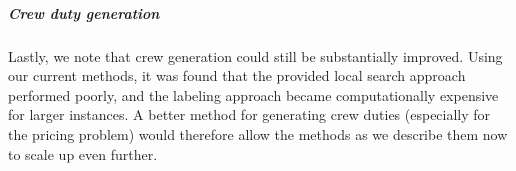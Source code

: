 \documentclass[]{article}
\begin{document}
\subparagraph{Crew duty generation}
Lastly, we note that crew generation could still be substantially improved. Using our current methods, it was found that the provided local search approach performed poorly, and the labeling approach became computationally expensive for larger instances. A better method for generating crew duties (especially for the pricing problem) would therefore allow the methods as we describe them now to scale up even further. 
\printbibliography
\end{document}
